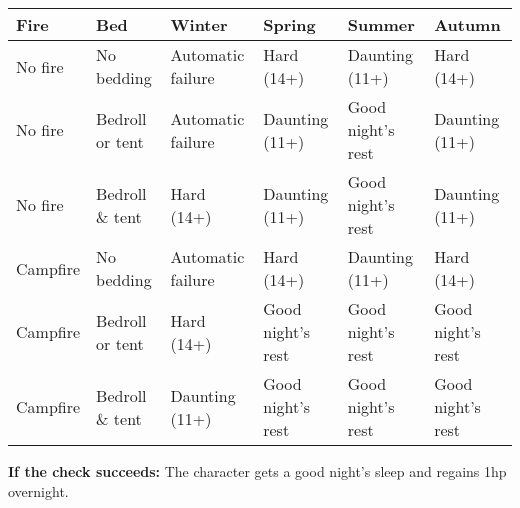 \documentclass{article}
\begin{document}
\begin{multicols}{2}
\begin{longtable}[]{@{}
  >{\raggedright\arraybackslash}p{}
  >{\raggedright\arraybackslash}p{}
  >{\raggedright\arraybackslash}p{}
  >{\raggedright\arraybackslash}p{}
  >{\raggedright\arraybackslash}p{}
  >{\raggedright\arraybackslash}p{}@{}}
\toprule\noalign{}
\begin{minipage}[b]{\linewidth}\raggedright
Fire
\end{minipage} & \begin{minipage}[b]{\linewidth}\raggedright
Bed
\end{minipage} & \begin{minipage}[b]{\linewidth}\raggedright
Winter
\end{minipage} & \begin{minipage}[b]{\linewidth}\raggedright
Spring
\end{minipage} & \begin{minipage}[b]{\linewidth}\raggedright
Summer
\end{minipage} & \begin{minipage}[b]{\linewidth}\raggedright
Autumn
\end{minipage} \\
\midrule\noalign{}
\endhead
\bottomrule\noalign{}
\endlastfoot
No fire & No bedding & Automatic failure & Hard (14+) & Daunting (11+) &
Hard (14+) \\
No fire & Bedroll or tent & Automatic failure & Daunting (11+) & Good
night's rest & Daunting (11+) \\
No fire & Bedroll \& tent & Hard (14+) & Daunting (11+) & Good night's
rest & Daunting (11+) \\
Campfire & No bedding & Automatic failure & Hard (14+) & Daunting (11+)
& Hard (14+) \\
Campfire & Bedroll or tent & Hard (14+) & Good night's rest & Good
night's rest & Good night's rest \\
Campfire & Bedroll \& tent & Daunting (11+) & Good night's rest & Good
night's rest & Good night's rest \\
\end{longtable}

\textbf{If the check succeeds:} The character gets a good night's sleep
and regains 1hp overnight.


\end{multicols}
\end{document}
